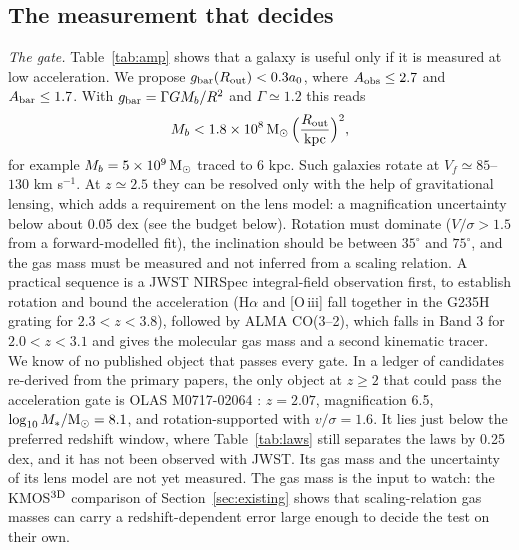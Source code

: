 \documentclass[fleqn,usenatbib]{mnras}
\begin{document}
\subsection{The measurement that decides}
\label{sec:design}
\emph{The gate.} Table~\ref{tab:amp} shows that a galaxy is useful only if it is measured at low acceleration. We propose $g_{\rm bar}(R_{\rm out})<0.3a_0$, where $A_{\rm obs}\le2.7$ and $A_{\rm bar}\le1.7$. With $g_{\rm bar}=\Gamma GM_b/R^2$ and $\Gamma\simeq1.2$ this reads
\begin{equation}
M_b<1.8\times10^{8}\,{\rm M_\odot}\,\Big(\frac{R_{\rm out}}{\rm kpc}\Big)^2 ,
\end{equation}
for example $M_b=5\times10^{9}\,{\rm M_\odot}$ traced to 6 kpc. Such galaxies rotate at $V_f\simeq85$--$130$ km s$^{-1}$. At $z\simeq2.5$ they can be resolved only with the help of gravitational lensing, which adds a requirement on the lens model: a magnification uncertainty below about 0.05 dex (see the budget below). Rotation must dominate ($V/\sigma>1.5$ from a forward-modelled fit), the inclination should be between $35^\circ$ and $75^\circ$, and the gas mass must be measured and not inferred from a scaling relation. A practical sequence is a JWST NIRSpec integral-field observation first, to establish rotation and bound the acceleration (H$\alpha$ and [O\,{\sc iii}] fall together in the G235H grating for $2.3<z<3.8$), followed by ALMA CO(3--2), which falls in Band 3 for $2.0<z<3.1$ and gives the molecular gas mass and a second kinematic tracer. We know of no published object that passes every gate. In a ledger of candidates re-derived from the primary papers, the only object at $z\geq2$ that could pass the acceleration gate is OLAS M0717-02064 \citep{Hirtenstein2019}: $z=2.07$, magnification 6.5, $\log_{10}M_*/{\rm M_\odot}=8.1$, and rotation-supported with $v/\sigma=1.6$. It lies just below the preferred redshift window, where Table~\ref{tab:laws} still separates the laws by 0.25 dex, and it has not been observed with JWST. Its gas mass and the uncertainty of its lens model are not yet measured. The gas mass is the input to watch: the KMOS$^{\rm 3D}$ comparison of Section~\ref{sec:existing} shows that scaling-relation gas masses can carry a redshift-dependent error large enough to decide the test on their own.
\end{document}
